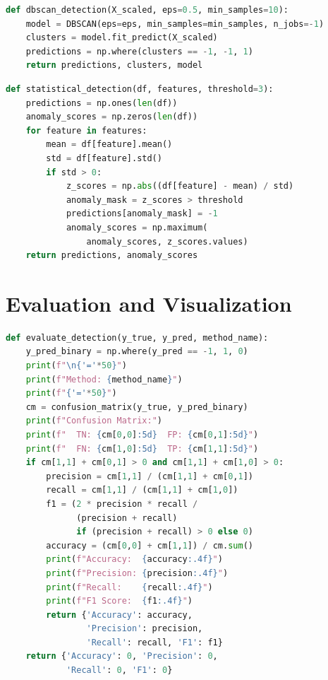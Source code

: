\documentclass[12pt,a4paper]{report}
\begin{document}
\begin{lstlisting}[language=Python, caption={DBSCAN clustering implementation}]
def dbscan_detection(X_scaled, eps=0.5, min_samples=10):
    model = DBSCAN(eps=eps, min_samples=min_samples, n_jobs=-1)
    clusters = model.fit_predict(X_scaled)
    predictions = np.where(clusters == -1, -1, 1)
    return predictions, clusters, model
\end{lstlisting}

\begin{lstlisting}[language=Python, caption={Statistical Z-Score method}]
def statistical_detection(df, features, threshold=3):
    predictions = np.ones(len(df))
    anomaly_scores = np.zeros(len(df))
    for feature in features:
        mean = df[feature].mean()
        std = df[feature].std()
        if std > 0:
            z_scores = np.abs((df[feature] - mean) / std)
            anomaly_mask = z_scores > threshold
            predictions[anomaly_mask] = -1
            anomaly_scores = np.maximum(
                anomaly_scores, z_scores.values)
    return predictions, anomaly_scores
\end{lstlisting}

\section{Evaluation and Visualization}
\begin{lstlisting}[language=Python, caption={Detection evaluation}]
def evaluate_detection(y_true, y_pred, method_name):
    y_pred_binary = np.where(y_pred == -1, 1, 0)
    print(f"\n{'='*50}")
    print(f"Method: {method_name}")
    print(f"{'='*50}")
    cm = confusion_matrix(y_true, y_pred_binary)
    print(f"Confusion Matrix:")
    print(f"  TN: {cm[0,0]:5d}  FP: {cm[0,1]:5d}")
    print(f"  FN: {cm[1,0]:5d}  TP: {cm[1,1]:5d}")
    if cm[1,1] + cm[0,1] > 0 and cm[1,1] + cm[1,0] > 0:
        precision = cm[1,1] / (cm[1,1] + cm[0,1])
        recall = cm[1,1] / (cm[1,1] + cm[1,0])
        f1 = (2 * precision * recall /
              (precision + recall)
              if (precision + recall) > 0 else 0)
        accuracy = (cm[0,0] + cm[1,1]) / cm.sum()
        print(f"Accuracy:  {accuracy:.4f}")
        print(f"Precision: {precision:.4f}")
        print(f"Recall:    {recall:.4f}")
        print(f"F1 Score:  {f1:.4f}")
        return {'Accuracy': accuracy,
                'Precision': precision,
                'Recall': recall, 'F1': f1}
    return {'Accuracy': 0, 'Precision': 0,
            'Recall': 0, 'F1': 0}
\end{lstlisting}
\end{document}
